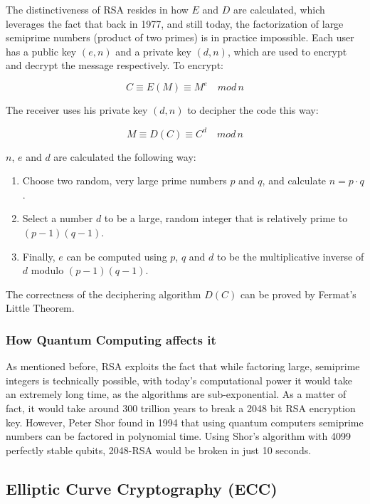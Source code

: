 The distinctiveness of RSA resides in how $E$ and $D$ are calculated, which
leverages the fact that back in 1977, and still today, the factorization of
large semiprime numbers (product of two primes) is in practice impossible. Each
user has a public key $(e, n)$ and a private key $(d,n)$, which are used to encrypt
and decrypt the message respectively. To encrypt:

\begin{equation}
    C \equiv E(M) \equiv M^e \quad mod \, n
\end{equation}

The receiver uses his private key $(d,n)$ to decipher the code this way:

\begin{equation}
    M \equiv D(C) \equiv C^d \quad mod \, n
\end{equation}

$n$, $e$ and $d$ are calculated the following way:
\begin{enumerate}
    \item Choose two random, very large prime numbers $p$ and $q$, and calculate $n = p \cdot q$.
    \item Select a number $d$ to be a large, random integer that is relatively prime to $(p-1)(q-1)$.
    \item Finally, $e$ can be computed using $p$, $q$ and $d$ to be the multiplicative inverse of $d$ modulo $(p-1)(q-1)$.
\end{enumerate}

The correctness of the deciphering algorithm $D(C)$ can be proved by Fermat's Little Theorem.

\subsubsection{How Quantum Computing affects it}

As mentioned before, RSA exploits the fact that while factoring large, semiprime
integers is technically possible, with today’s computational power it would take
an extremely long time, as the algorithms are sub-exponential. As a matter of
fact, it would take around 300 trillion years to break a 2048 bit RSA encryption
key. However, Peter Shor found in 1994 that using quantum computers semiprime
numbers can be factored in polynomial time. Using Shor’s algorithm with 4099
perfectly stable qubits, 2048-RSA would be broken in just 10 seconds.


\pagebreak
\subsection{Elliptic Curve Cryptography (ECC)}


